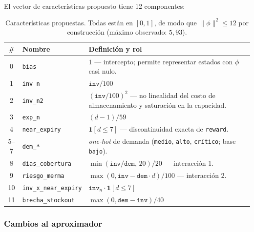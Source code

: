 \documentclass[11pt,letterpaper]{article}
\begin{document}
El vector de características propuesto tiene 12 componentes:

\begin{table}[h]
\centering
\small
\begin{tabular}{clp{8.3cm}}
\toprule
\textbf{\#} & \textbf{Nombre} & \textbf{Definición y rol} \\
\midrule
0  & \texttt{bias}              & $1$ --- intercepto; permite representar estados con $\phi$ casi nulo. \\
1  & \texttt{inv\_n}            & $\texttt{inv}/100$ \\
2  & \texttt{inv\_n2}           & $(\texttt{inv}/100)^2$ --- no linealidad del costo de almacenamiento y saturación en la capacidad. \\
3  & \texttt{exp\_n}            & $(d-1)/59$ \\
4  & \texttt{near\_expiry}      & $\mathbf{1}[d \le 7]$ --- discontinuidad exacta de \texttt{reward}. \\
5--7 & \texttt{dem\_*}          & \emph{one-hot} de demanda (\texttt{medio}, \texttt{alto}, \texttt{crítico}; base \texttt{bajo}). \\
8  & \texttt{dias\_cobertura}   & $\min(\texttt{inv}/\texttt{dem},\,20)/20$ --- interacción 1. \\
9  & \texttt{riesgo\_merma}     & $\max(0, \texttt{inv} - \texttt{dem}\cdot d)/100$ --- interacción 2. \\
10 & \texttt{inv\_x\_near\_expiry} & $\texttt{inv}_n \cdot \mathbf{1}[d\le 7]$ \\
11 & \texttt{brecha\_stockout}  & $\max(0, \texttt{dem} - \texttt{inv})/40$ \\
\bottomrule
\end{tabular}
\caption{Características propuestas. Todas están en $[0,1]$, de modo que
$\lVert\phi\rVert^2 \le 12$ por construcción (máximo observado: $5{,}93$).}
\end{table}



\subsubsection*{Cambios al aproximador}
\end{document}
